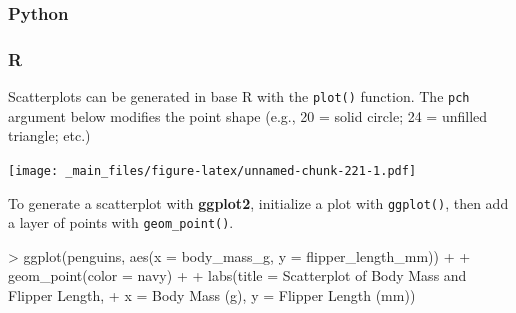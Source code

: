 \documentclass[
]{book}
\newenvironment{Shaded}{\begin{snugshade}}{\end{snugshade}}
\newcommand{\AttributeTok}[1]{\textcolor[rgb]{0.77,0.63,0.00}{#1}}
\newcommand{\DecValTok}[1]{\textcolor[rgb]{0.00,0.00,0.81}{#1}}
\newcommand{\FunctionTok}[1]{\textcolor[rgb]{0.00,0.00,0.00}{#1}}
\newcommand{\NormalTok}[1]{#1}
\newcommand{\SpecialCharTok}[1]{\textcolor[rgb]{0.00,0.00,0.00}{#1}}
\newcommand{\StringTok}[1]{\textcolor[rgb]{0.31,0.60,0.02}{#1}}
\begin{document}
\hypertarget{python-40}{%
\subsubsection*{Python}\label{python-40}}

\hypertarget{r-40}{%
\subsubsection*{R}\label{r-40}}

Scatterplots can be generated in base R with the \texttt{plot()} function. The \texttt{pch} argument below modifies the point shape (e.g., 20 = solid circle; 24 = unfilled triangle; etc.)

\begin{Shaded}
\end{Shaded}

\texttt{[image: \_main\_files/figure-latex/unnamed-chunk-221-1.pdf]}

To generate a scatterplot with \textbf{ggplot2}, initialize a plot with \texttt{ggplot()}, then add a layer of points with \texttt{geom\_point()}.

\begin{Shaded}
\begin{Highlighting}[]
\SpecialCharTok{\textgreater{}} \FunctionTok{ggplot}\NormalTok{(penguins, }\FunctionTok{aes}\NormalTok{(}\AttributeTok{x =}\NormalTok{ body\_mass\_g, }\AttributeTok{y =}\NormalTok{ flipper\_length\_mm)) }\SpecialCharTok{+}
\SpecialCharTok{+}   \FunctionTok{geom\_point}\NormalTok{(}\AttributeTok{color =} \StringTok{\textquotesingle{}navy\textquotesingle{}}\NormalTok{) }\SpecialCharTok{+}
\SpecialCharTok{+}   \FunctionTok{labs}\NormalTok{(}\AttributeTok{title =} \StringTok{\textquotesingle{}Scatterplot of Body Mass and Flipper Length\textquotesingle{}}\NormalTok{, }
\SpecialCharTok{+}        \AttributeTok{x =} \StringTok{\textquotesingle{}Body Mass (g)\textquotesingle{}}\NormalTok{, }\AttributeTok{y =} \StringTok{\textquotesingle{}Flipper Length (mm)\textquotesingle{}}\NormalTok{)}
\end{Highlighting}
\end{Shaded}
\end{document}
